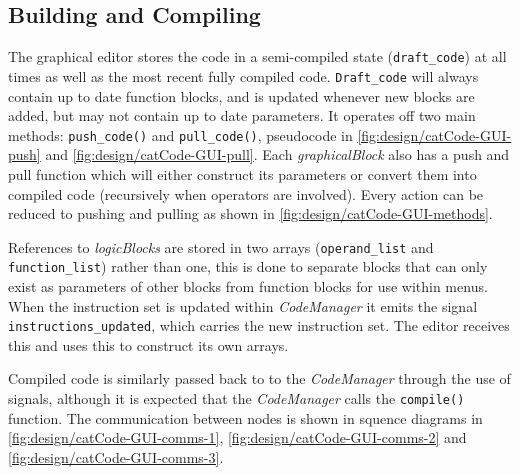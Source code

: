 \subsection{Building and Compiling}

The graphical editor stores the code in a semi-compiled state (\texttt{draft\_code}) at all times as well as the most recent fully compiled code. \texttt{Draft\_code} will always contain up to date function blocks, and is updated whenever new blocks are added, but may not contain up to date parameters. It operates off two main methods: \texttt{push\_code()} and \texttt{pull\_code()}, pseudocode in \autoref{fig:design/catCode-GUI-push} and \autoref{fig:design/catCode-GUI-pull}. Each \textit{graphicalBlock} also has a push and pull function which will either construct its parameters or convert them into compiled code (recursively when operators are involved). Every action can be reduced to pushing and pulling as shown in \autoref{fig:design/catCode-GUI-methods}.

References to \textit{logicBlocks} are stored in two arrays (\texttt{operand\_list} and \texttt{function\_list}) rather than one, this is done to separate blocks that can only exist as parameters of other blocks from function blocks for use within menus. When the instruction set is updated within \textit{CodeManager} it emits the signal \texttt{instructions\_updated}, which carries the new instruction set. The editor receives this and uses this to construct its own arrays.

Compiled code is similarly passed back to to the \textit{CodeManager} through the use of signals, although it is expected that the \textit{CodeManager} calls the \texttt{compile()} function. The communication between nodes is shown in squence diagrams in \autoref{fig:design/catCode-GUI-comms-1}, \ref{fig:design/catCode-GUI-comms-2} and \ref{fig:design/catCode-GUI-comms-3}.

